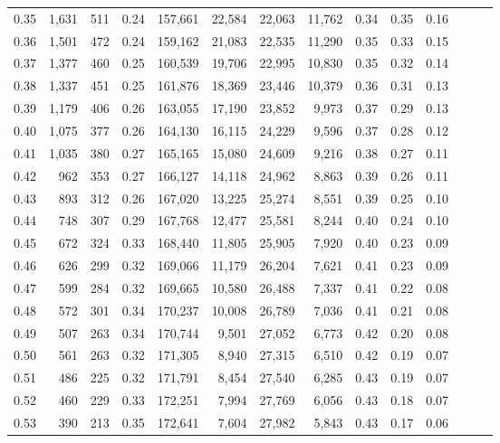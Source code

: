 \begin{tabular}{rrrrrrrrrrrrrr}
0.35 &  1,631 &  511 &  0.24 &  157,661 &   22,584 &  22,063 &  11,762 &  0.34 &  0.35 &      0.16 \\
0.36 &  1,501 &  472 &  0.24 &  159,162 &   21,083 &  22,535 &  11,290 &  0.35 &  0.33 &      0.15 \\
0.37 &  1,377 &  460 &  0.25 &  160,539 &   19,706 &  22,995 &  10,830 &  0.35 &  0.32 &      0.14 \\
0.38 &  1,337 &  451 &  0.25 &  161,876 &   18,369 &  23,446 &  10,379 &  0.36 &  0.31 &      0.13 \\
0.39 &  1,179 &  406 &  0.26 &  163,055 &   17,190 &  23,852 &   9,973 &  0.37 &  0.29 &      0.13 \\
0.40 &  1,075 &  377 &  0.26 &  164,130 &   16,115 &  24,229 &   9,596 &  0.37 &  0.28 &      0.12 \\
0.41 &  1,035 &  380 &  0.27 &  165,165 &   15,080 &  24,609 &   9,216 &  0.38 &  0.27 &      0.11 \\
0.42 &    962 &  353 &  0.27 &  166,127 &   14,118 &  24,962 &   8,863 &  0.39 &  0.26 &      0.11 \\
0.43 &    893 &  312 &  0.26 &  167,020 &   13,225 &  25,274 &   8,551 &  0.39 &  0.25 &      0.10 \\
0.44 &    748 &  307 &  0.29 &  167,768 &   12,477 &  25,581 &   8,244 &  0.40 &  0.24 &      0.10 \\
0.45 &    672 &  324 &  0.33 &  168,440 &   11,805 &  25,905 &   7,920 &  0.40 &  0.23 &      0.09 \\
0.46 &    626 &  299 &  0.32 &  169,066 &   11,179 &  26,204 &   7,621 &  0.41 &  0.23 &      0.09 \\
0.47 &    599 &  284 &  0.32 &  169,665 &   10,580 &  26,488 &   7,337 &  0.41 &  0.22 &      0.08 \\
0.48 &    572 &  301 &  0.34 &  170,237 &   10,008 &  26,789 &   7,036 &  0.41 &  0.21 &      0.08 \\
0.49 &    507 &  263 &  0.34 &  170,744 &    9,501 &  27,052 &   6,773 &  0.42 &  0.20 &      0.08 \\
0.50 &    561 &  263 &  0.32 &  171,305 &    8,940 &  27,315 &   6,510 &  0.42 &  0.19 &      0.07 \\
0.51 &    486 &  225 &  0.32 &  171,791 &    8,454 &  27,540 &   6,285 &  0.43 &  0.19 &      0.07 \\
0.52 &    460 &  229 &  0.33 &  172,251 &    7,994 &  27,769 &   6,056 &  0.43 &  0.18 &      0.07 \\
0.53 &    390 &  213 &  0.35 &  172,641 &    7,604 &  27,982 &   5,843 &  0.43 &  0.17 &      0.06 \\

\end{tabular}
